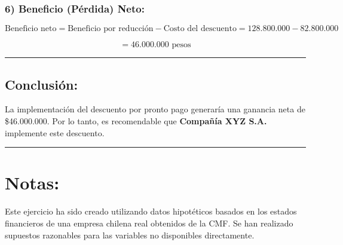 \documentclass[
  letterpaper,
  DIV=11,
  numbers=noendperiod]{scrartcl}
\begin{document}
\subsubsection{6) Beneficio (Pérdida)
Neto:}\label{beneficio-puxe9rdida-neto}

\[
\text{Beneficio neto} = \text{Beneficio por reducción} - \text{Costo del descuento} = 128.800.000 - 82.800.000
\]

\[
= 46.000.000 \text{ pesos}
\]

\begin{center}\rule{0.5\linewidth}{0.5pt}\end{center}

\subsection{Conclusión:}\label{conclusiuxf3n-1}

La implementación del descuento por pronto pago generaría una ganancia
neta de \$46.000.000. Por lo tanto, es recomendable que \textbf{Compañía
XYZ S.A.} implemente este descuento.

\begin{center}\rule{0.5\linewidth}{0.5pt}\end{center}

\section{Notas:}\label{notas}

Este ejercicio ha sido creado utilizando datos hipotéticos basados en
los estados financieros de una empresa chilena real obtenidos de la CMF.
Se han realizado supuestos razonables para las variables no disponibles
directamente.
\end{document}
